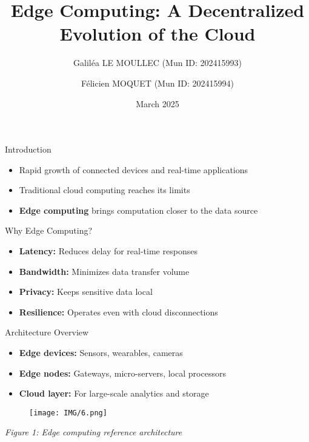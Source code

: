 \documentclass{beamer}
\title{Edge Computing: A Decentralized Evolution of the Cloud}
\author{Galiléa LE MOULLEC (Mun ID: 202415993) \and Félicien MOQUET (Mun ID: 202415994)}
\institute{Memorial University of Newfoundland, St. John's, Canada}
\date{March 2025}
\begin{document}
\begin{frame}
  \titlepage
\end{frame}

\begin{frame}{Introduction}
  \begin{itemize}
    \item Rapid growth of connected devices and real-time applications
    \item Traditional cloud computing reaches its limits
    \item \textbf{Edge computing} brings computation closer to the data source
  \end{itemize}
\end{frame}

\begin{frame}{Why Edge Computing?}
  \begin{itemize}
    \item \textbf{Latency:} Reduces delay for real-time responses
    \item \textbf{Bandwidth:} Minimizes data transfer volume
    \item \textbf{Privacy:} Keeps sensitive data local
    \item \textbf{Resilience:} Operates even with cloud disconnections
  \end{itemize}
\end{frame}

\begin{frame}{Architecture Overview}
  \begin{itemize}
    \item \textbf{Edge devices:} Sensors, wearables, cameras
    \item \textbf{Edge nodes:} Gateways, micro-servers, local processors
    \item \textbf{Cloud layer:} For large-scale analytics and storage
  \end{itemize}
  \vspace{0.5cm}
  \centering
  \begin{figure}
    \centering
    \texttt{[image: IMG/6.png]} %
  \end{figure}

  \vspace{0.2cm}
  \small \textit{Figure 1: Edge computing reference architecture}

\end{frame}
\end{document}
